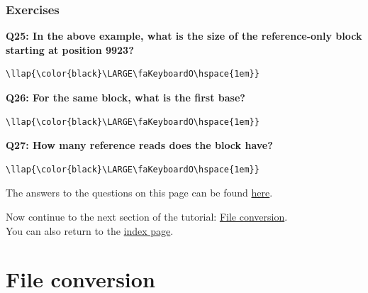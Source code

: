 \documentclass[11pt]{article}
\begin{document}
    \hypertarget{exercises}{%
\subsubsection{Exercises}\label{exercises}}

\textbf{Q25: In the above example, what is the size of the
reference-only block starting at position 9923?}

\begin{terminalinput}
\begin{Verbatim}[commandchars=\\\{\}]
\llap{\color{black}\LARGE\faKeyboardO\hspace{1em}}
\end{Verbatim}
\end{terminalinput}

    \textbf{Q26: For the same block, what is the first base?}

\begin{terminalinput}
\begin{Verbatim}[commandchars=\\\{\}]
\llap{\color{black}\LARGE\faKeyboardO\hspace{1em}}
\end{Verbatim}
\end{terminalinput}

    \textbf{Q27: How many reference reads does the block have?}

\begin{terminalinput}
\begin{Verbatim}[commandchars=\\\{\}]
\llap{\color{black}\LARGE\faKeyboardO\hspace{1em}}
\end{Verbatim}
\end{terminalinput}

    The answers to the questions on this page can be found
\href{formats-answers.ipynb}{here}.

Now continue to the next section of the tutorial:
\href{conversion.ipynb}{File conversion}.\\
You can also return to the \href{index.ipynb}{index page}.





\newpage






    \hypertarget{file-conversion}{%
\section{File conversion}\label{file-conversion}}
\end{document}

